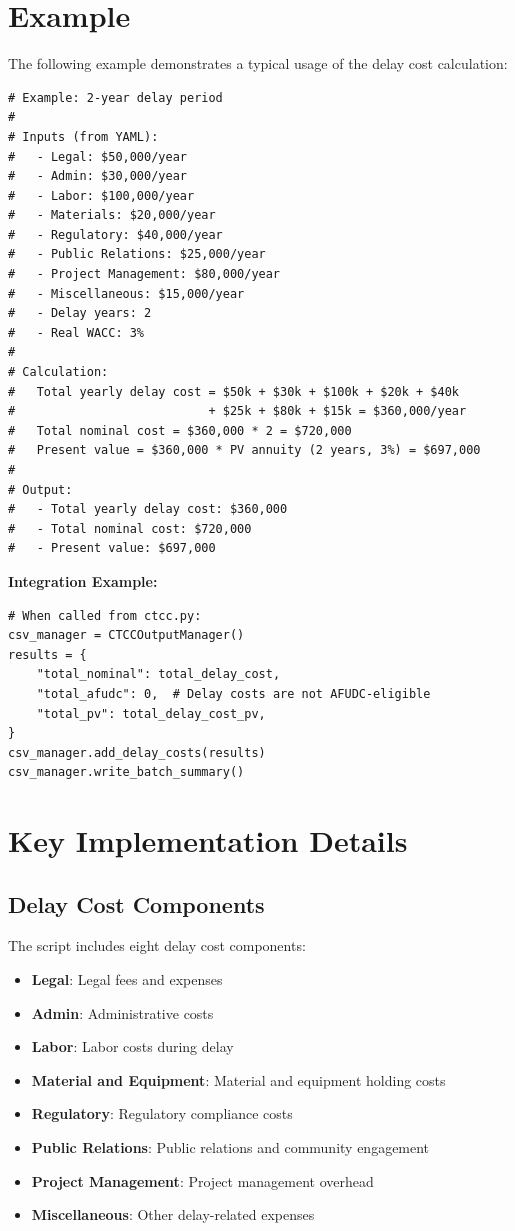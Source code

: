 \documentclass[12pt]{article}
\begin{document}
\section{Example}

The following example demonstrates a typical usage of the delay cost calculation:

\begin{lstlisting}
# Example: 2-year delay period
# 
# Inputs (from YAML):
#   - Legal: $50,000/year
#   - Admin: $30,000/year
#   - Labor: $100,000/year
#   - Materials: $20,000/year
#   - Regulatory: $40,000/year
#   - Public Relations: $25,000/year
#   - Project Management: $80,000/year
#   - Miscellaneous: $15,000/year
#   - Delay years: 2
#   - Real WACC: 3%
#
# Calculation:
#   Total yearly delay cost = $50k + $30k + $100k + $20k + $40k 
#                           + $25k + $80k + $15k = $360,000/year
#   Total nominal cost = $360,000 * 2 = $720,000
#   Present value = $360,000 * PV annuity (2 years, 3%) = $697,000
#
# Output:
#   - Total yearly delay cost: $360,000
#   - Total nominal cost: $720,000
#   - Present value: $697,000
\end{lstlisting}

\textbf{Integration Example:}

\begin{lstlisting}
# When called from ctcc.py:
csv_manager = CTCCOutputManager()
results = {
    "total_nominal": total_delay_cost,
    "total_afudc": 0,  # Delay costs are not AFUDC-eligible
    "total_pv": total_delay_cost_pv,
}
csv_manager.add_delay_costs(results)
csv_manager.write_batch_summary()
\end{lstlisting}

\section{Key Implementation Details}

\subsection{Delay Cost Components}

The script includes eight delay cost components:
\begin{itemize}
    \item \textbf{Legal}: Legal fees and expenses
    \item \textbf{Admin}: Administrative costs
    \item \textbf{Labor}: Labor costs during delay
    \item \textbf{Material and Equipment}: Material and equipment holding costs
    \item \textbf{Regulatory}: Regulatory compliance costs
    \item \textbf{Public Relations}: Public relations and community engagement
    \item \textbf{Project Management}: Project management overhead
    \item \textbf{Miscellaneous}: Other delay-related expenses
\end{itemize}
\end{document}
